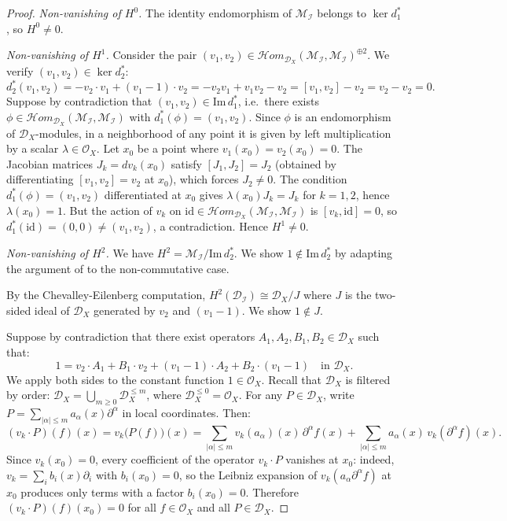 \documentclass[12pt,a4paper]{article}
\begin{document}
\begin{proof}
\smallskip
\textit{Non-vanishing of $H^0$.}
The identity endomorphism of $\mathcal{M}_{\mathcal{I}}$ belongs to
$\ker d_1^*$, so $H^0 \neq 0$.

\smallskip
\textit{Non-vanishing of $H^1$.}
Consider the pair $(v_1, v_2) \in \mathcal{H}om_{\mathcal{D}_X}
(\mathcal{M}_{\mathcal{I}}, \mathcal{M}_{\mathcal{I}})^{\oplus 2}$.
We verify $(v_1, v_2) \in \ker d_2^*$:
\[
d_2^*(v_1, v_2)
= -v_2 \cdot v_1 + (v_1 - 1) \cdot v_2
= -v_2 v_1 + v_1 v_2 - v_2
= [v_1, v_2] - v_2 = v_2 - v_2 = 0.
\]
Suppose by contradiction that $(v_1, v_2) \in \mathrm{Im}\, d_1^*$,
i.e.\ there exists
$\phi \in \mathcal{H}om_{\mathcal{D}_X}(\mathcal{M}_{\mathcal{I}},
\mathcal{M}_{\mathcal{I}})$ with $d_1^*(\phi) = (v_1, v_2)$.
Since $\phi$ is an endomorphism of $\mathcal{D}_X$-modules, in a
neighborhood of any point it is given by left multiplication by a scalar
$\lambda \in \mathcal{O}_X$. Let $x_0$ be a point where $v_1(x_0) =
v_2(x_0) = 0$. The Jacobian matrices $J_k = dv_k(x_0)$ satisfy
$[J_1, J_2] = J_2$ (obtained by differentiating $[v_1,v_2]=v_2$ at $x_0$),
which forces $J_2 \neq 0$.
The condition $d_1^*(\phi) = (v_1, v_2)$ differentiated at $x_0$ gives
$\lambda(x_0) J_k = J_k$ for $k=1,2$, hence $\lambda(x_0) = 1$.
But the action of $v_k$ on $\mathrm{id} \in
\mathcal{H}om_{\mathcal{D}_X}(\mathcal{M}_{\mathcal{I}},
\mathcal{M}_{\mathcal{I}})$ is $[v_k, \mathrm{id}] = 0$, so
$d_1^*(\mathrm{id}) = (0, 0) \neq (v_1, v_2)$,
a contradiction. Hence $H^1 \neq 0$.

\smallskip
\textit{Non-vanishing of $H^2$.}
We have $H^2 = \mathcal{M}_{\mathcal{I}} / \mathrm{Im}\, d_2^*$.
We show $1 \notin \mathrm{Im}\, d_2^*$ by adapting the argument of
\cite[Thm.~3.6(B)]{D16} to the non-commutative case.

By the Chevalley-Eilenberg computation,
$H^2(\mathcal{D}_{\mathcal{I}}) \cong
\mathcal{D}_X \big/ J$
where $J$ is the two-sided ideal of $\mathcal{D}_X$ generated by
$v_2$ and $(v_1 - 1)$. We show $1 \notin J$.

Suppose by contradiction that there exist operators
$A_1, A_2, B_1, B_2 \in \mathcal{D}_X$ such that:
\[
1 = v_2 \cdot A_1 + B_1 \cdot v_2
  + (v_1-1) \cdot A_2 + B_2 \cdot (v_1-1)
\quad \text{in } \mathcal{D}_X.
\]
We apply both sides to the constant function $1 \in \mathcal{O}_X$.
Recall that $\mathcal{D}_X$ is filtered by order:
$\mathcal{D}_X = \bigcup_{m \geq 0} \mathcal{D}_X^{\leq m}$,
where $\mathcal{D}_X^{\leq 0} = \mathcal{O}_X$.
For any $P \in \mathcal{D}_X$, write $P = \sum_{|\alpha| \leq m}
a_\alpha(x) \partial^\alpha$ in local coordinates. Then:
\[
(v_k \cdot P)(f)(x)
= v_k\bigl(P(f)\bigr)(x)
= \sum_{|\alpha| \leq m} v_k(a_\alpha)(x)\,\partial^\alpha f(x)
+ \sum_{|\alpha| \leq m} a_\alpha(x)\, v_k(\partial^\alpha f)(x).
\]
Since $v_k(x_0) = 0$, every coefficient of the operator $v_k \cdot P$
vanishes at $x_0$: indeed, $v_k = \sum_i b_i(x)\partial_i$ with
$b_i(x_0) = 0$, so the Leibniz expansion of $v_k(a_\alpha \partial^\alpha f)$
at $x_0$ produces only terms with a factor $b_i(x_0) = 0$.
Therefore $(v_k \cdot P)(f)(x_0) = 0$ for all $f \in \mathcal{O}_X$
and all $P \in \mathcal{D}_X$.


\end{proof}
\end{document}
